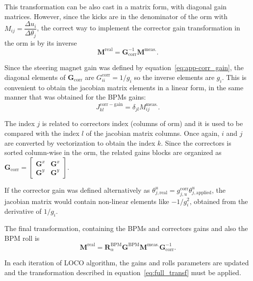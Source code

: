 This transformation can be also cast in a matrix form, with diagonal gain matrices. However, since the kicks are in the denominator of the \gls{orm} with $M_{ij} = \dfrac{\Delta u_i}{\Delta \theta_j}$, the correct way to implement the corrector gain transformation in the \gls{orm} is by its inverse
\begin{equation}
        \mathbf{M}^{\mathrm{real}} = \mathbf{G}^{-1}_{\mathrm{corr}} \mathbf{M}^{\mathrm{meas.}}.
\end{equation}

Since the steering magnet gain was defined by equation~\eqref{eq:app-corr_gain}, the diagonal elements of $\mathbf{G}_{\mathrm{corr}}$ are $G^{\mathrm{corr}}_{ii} = 1/g_{i}$ so the inverse elements are $g_{i}$. This is convenient to obtain the jacobian matrix elements in a linear form, in the same manner that was obtained for the BPMs gains:
\begin{equation}
    J_{kl}^{\mathrm{corr}-\mathrm{gain}} = \delta_{jl}M^{\mathrm{meas.}}_{ij}.
\end{equation}

The index $j$ is related to correctors index (columns of \gls{orm}) and it is used to be compared with the index $l$ of the jacobian matrix columns. Once again, $i$ and $j$ are converted by vectorization to obtain the index $k$. Since the correctors is sorted column-wise in the \gls{orm}, the related gains blocks are organized as $\mathbf{G}_{\mathrm{corr}} =
    \begin{bmatrix}
    \mathbf{G}^x & \mathbf{G}^x \\
    \mathbf{G}^y & \mathbf{G}^y
    \end{bmatrix}$.

If the corrector gain was defined alternatively as $\theta_{j, \mathrm{real}}^u = g_{j, u}^{\mathrm{corr}}\theta_{j, \mathrm{applied}}^u$, the jacobian matrix would contain non-linear elements like $-1/g_{i}^2$, obtained from the derivative of $1/g_{i}$.

The final transformation, containing the BPMs and correctors gains and also the BPM roll is
\begin{equation}
    \mathbf{M}^{\mathrm{real}} = \mathbf{R}^\mathrm{BPM}_\alpha\mathbf{G}^{\mathrm{BPM}} \mathbf{M}^{\mathrm{meas.}}\mathbf{G}^{-1}_{\mathrm{corr}}.
    \label{eq:full_transf}
\end{equation}

In each iteration of LOCO algorithm, the gains and rolls parameters are updated and the transformation described in equation~\eqref{eq:full_transf} must be applied.

